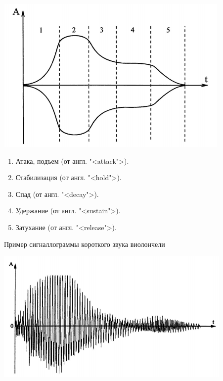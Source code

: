 \documentclass{beamer}
\begin{document}
\begin{frame}
\begin{center}
\includegraphics[scale=0.7]{pic-waveform-03}
\end{center}
\begin{enumerate}
\item Атака, подъем (от англ. "<attack">).
\item Стабилизация (от англ. "<hold">).
\item Спад (от англ. "<decay">).
\item Удержание (от англ. "<sustain">).
\item Затухание (от англ. "<release">).
\end{enumerate}
\end{frame}  

\begin{frame}
\begin{block}{Пример сигналлограммы короткого звука виолончели}
\begin{center}
\includegraphics[scale=0.8]{pic-waveform-04}
\end{center}
\end{block}
\end{frame} 
\end{document}
